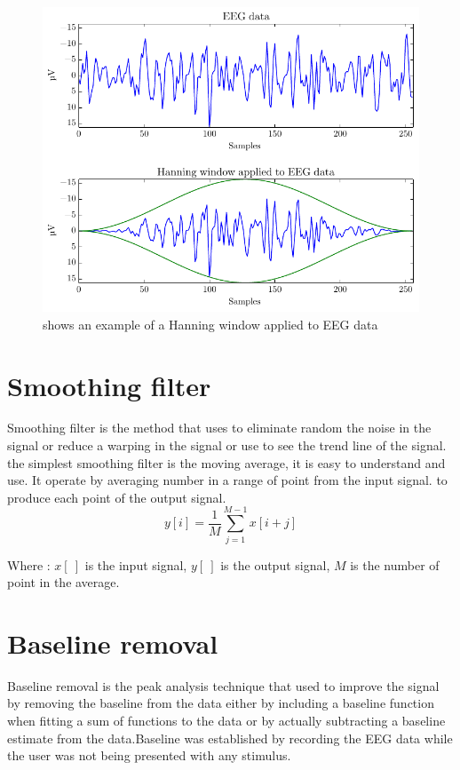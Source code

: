 \begin{figure}[ht]
	\centering
	\includegraphics[scale = 0.75]{chapter3/window.pdf}
	\caption{shows an example of a Hanning window applied to EEG data\cite{ft}}
    \label{fig:window}
\end{figure}


\section{Smoothing filter}
\hspace{1.5cm}Smoothing filter is the method that uses to eliminate random the noise in the signal or reduce a warping in the signal or use to see the trend line of the signal. the simplest smoothing filter is the moving average, it is easy to understand and use. It operate by averaging number in a range of point from the input signal. to produce each point of the output signal. \\
\begin{equation}\label{eq:win}
	 y[i] = \frac{1}{M}\sum\limits ^{M-1}_{j=1} x[i+j]
\end{equation}

Where : $x[~]$ is the input signal, $y[~]$ is the output signal,
	   $M$ is the number of point in the average.

\section{Baseline removal}
\hspace{1.5cm} Baseline removal is the peak analysis technique that used to improve the signal by removing the baseline from the data either by including a baseline function when fitting a sum of functions to the data or by actually subtracting a baseline estimate from the data.Baseline was established by recording the EEG data while the user was not being presented with any stimulus. \\





